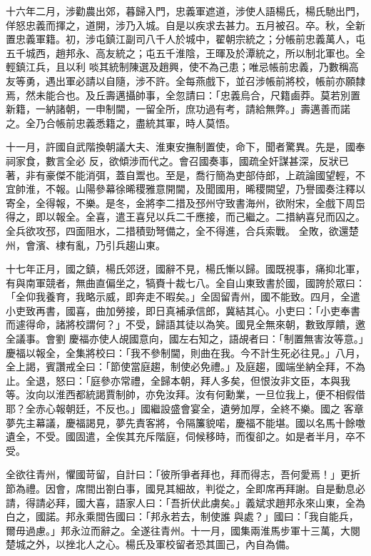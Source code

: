 \begin{pinyinscope}
 十六年二月，涉勸農出郊，暮歸入門，忠義軍遮道，涉使人語楊氏，楊氏馳出門，佯怒忠義而揮之，道開，涉乃入城。自是以疾求去甚力。五月被召。卒。秋，全新置忠義軍籍。初，涉屯鎮江副司八千人於城中，翟朝宗統之；分帳前忠義萬人，屯五千城西，趙邦永、高友統之；屯五千淮陰，王暉及於潭統之，所以制北軍也。全輕鎮江兵，且以利
 啖其統制陳選及趙興，使不為己患；唯忌帳前忠義，乃數稱高友等勇，遇出軍必請以自隨，涉不許。全每燕戲下，並召涉帳前將校，帳前亦願隸焉，然未能合也。及丘壽邁攝帥事，全忽請曰：「忠義烏合，尺籍鹵莽。莫若別置新籍，一納諸朝，一申制閫，一留全所，庶功過有考，請給無弊。」壽邁善而諾之。全乃合帳前忠義悉籍之，盡統其軍，時人莫悟。



 十一月，許國自武階換朝議大夫、淮東安撫制置使，命下，聞者驚異。先是，國奉祠家食，數言全必
 反，欲傾涉而代之。會召國奏事，國疏全奸謀甚深，反狀已著，非有豪傑不能消弭，蓋自鬻也。至是，喬行簡為吏部侍郎，上疏論國望輕，不宜帥淮，不報。山陽參幕徐晞稷雅意開閫，及聞國用，晞稷闕望，乃譽國奏注釋以寄全，全得報，不樂。是冬，金將李二措及邳州守致書海州，欲附宋，全戲下周岊得之，即以報全。全喜，遣王喜兒以兵二千應接，而己繼之。二措納喜兒而囚之。全兵欲攻邳，四面阻水，二措積勁弩備之，全不得進，合兵索戰。
 全敗，欲還楚州，會濱、棣有亂，乃引兵趨山東。



 十七年正月，國之鎮，楊氏郊迓，國辭不見，楊氏慚以歸。國既視事，痛抑北軍，有與南軍競者，無曲直偏坐之，犒賚十裁七八。全自山東致書於國，國誇於眾曰：「全仰我養育，我略示威，即奔走不暇矣。」全固留青州，國不能致。四月，全遣小吏致再書，國喜，曲加勞接，即日真補承信郎，冀結其心。小吏曰：「小吏奉書而遽得命，諸將校謂何？」不受，歸語其徒以為笑。國見全無來朝，數致厚饋，邀全議事。會劉
 慶福亦使人覘國意向，國左右知之，語覘者曰：「制置無害汝等意。」慶福以報全，全集將校曰：「我不參制閫，則曲在我。今不計生死必往見。」八月，全上謁，賓讚戒全曰：「節使當庭趨，制使必免禮。」及庭趨，國端坐納全拜，不為止。全退，怒曰：「庭參亦常禮，全歸本朝，拜人多矣，但恨汝非文臣，本與我等。汝向以淮西都統謁賈制帥，亦免汝拜。汝有何勳業，一旦位我上，便不相假借耶？全赤心報朝廷，不反也。」國繼設盛會宴全，遺勞加厚，全終不樂。國之
 客章夢先主幕議，慶福謁見，夢先責客將，令隔簾貌喏，慶福不能堪。國以名馬十餘噭遺全，不受。國固遣，全俟其充斥階庭，伺候移時，而復卻之。如是者半月，卒不受。



 全欲往青州，懼國苛留，自計曰：「彼所爭者拜也，拜而得志，吾何愛焉！」更折節為禮。因會，席間出劄白事，國見其細故，判從之，全即席再拜謝。自是動息必請，得請必拜，國大喜，語家人曰：「吾折伏此虜矣。」義斌求趙邦永來山東，全為白之，國諾。邦永乘間告國曰：「邦永若去，制使誰
 與處？」國曰：「我自能兵，爾毋過慮。」邦永泣而辭之。全遂往青州。十一月，國集兩淮馬步軍十三萬，大閱楚城之外，以挫北人之心。楊氏及軍校留者恐其圖己，內自為備。




\end{pinyinscope}
